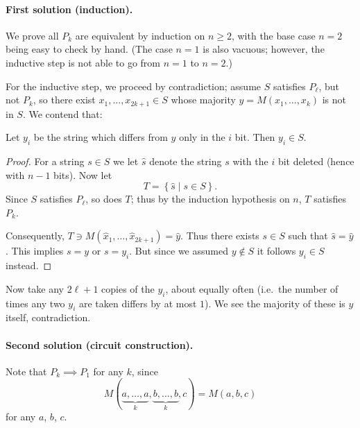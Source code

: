 \documentclass[11pt]{scrartcl}
\begin{document}
\paragraph{First solution (induction).}
We prove all $P_k$ are equivalent by induction on $n \ge 2$,
with the base case $n = 2$ being easy to check by hand.
(The case $n=1$ is also vacuous; however,
the inductive step is not able to go from $n=1$ to $n=2$.)

For the inductive step, we proceed by contradiction;
assume $S$ satisfies $P_{\ell}$, but not $P_{k}$,
so there exist $x_1, \dots, x_{2k+1} \in S$
whose majority $y = M(x_1, \dots, x_k)$ is not in $S$.
We contend that:
\begin{claim*}
  Let $y_i$ be the string which differs from $y$
  only in the $i$ bit.
  Then $y_i \in S$.
\end{claim*}
\begin{proof}
  For a string $s \in S$
  we let $\hat s$ denote the string $s$ with the $i$ bit deleted
  (hence with $n-1$ bits).
  Now let \[ T = \left\{ \hat s \mid s \in S \right\}. \]
  Since $S$ satisfies $P_\ell$, so does $T$;
  thus by the induction hypothesis on $n$, $T$ satisfies $P_{k}$.

  Consequently, $T \ni M(\hat{x}_1, \dots, \hat{x}_{2k+1}) = \hat y$.
  Thus there exists $s \in S$ such that $\hat s = \hat y$.
  This implies $s = y$ or $s = y_i$.
  But since we assumed $y \notin S$ it follows $y_i \in S$ instead.
\end{proof}

Now take any $2\ell+1$ copies of the $y_i$, about equally often
(i.e.\ the number of times
any two $y_i$ are taken differs by at most $1$).
We see the majority of these is $y$ itself, contradiction.

\paragraph{Second solution (circuit construction).}
Note that $P_k \implies P_1$ for any $k$, since
\[ M( \underbrace{a,\dots,a}_k, \underbrace{b,\dots,b}_k, c )
  = M(a,b,c) \]
for any $a$, $b$, $c$.
\end{document}
